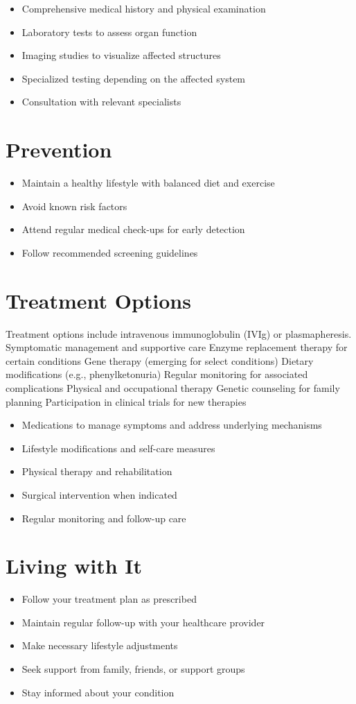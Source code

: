 \begin{itemize}[noitemsep]
  \item Comprehensive medical history and physical examination
  \item Laboratory tests to assess organ function
  \item Imaging studies to visualize affected structures
  \item Specialized testing depending on the affected system
  \item Consultation with relevant specialists
\end{itemize}
\section{Prevention}
\begin{itemize}[noitemsep]
  \item Maintain a healthy lifestyle with balanced diet and exercise
  \item Avoid known risk factors
  \item Attend regular medical check-ups for early detection
  \item Follow recommended screening guidelines
\end{itemize}
\section{Treatment Options}
Treatment options include intravenous immunoglobulin (IVIg) or plasmapheresis. Symptomatic management and supportive care Enzyme replacement therapy for certain conditions Gene therapy (emerging for select conditions) Dietary modifications (e.g., phenylketonuria) Regular monitoring for associated complications Physical and occupational therapy Genetic counseling for family planning Participation in clinical trials for new therapies

\begin{itemize}[noitemsep]
  \item Medications to manage symptoms and address underlying mechanisms
  \item Lifestyle modifications and self-care measures
  \item Physical therapy and rehabilitation
  \item Surgical intervention when indicated
  \item Regular monitoring and follow-up care
\end{itemize}
\section{Living with It}
\begin{itemize}[noitemsep]
  \item Follow your treatment plan as prescribed
  \item Maintain regular follow-up with your healthcare provider
  \item Make necessary lifestyle adjustments
  \item Seek support from family, friends, or support groups
  \item Stay informed about your condition
\end{itemize}
